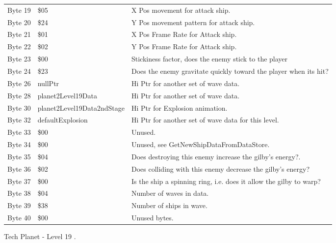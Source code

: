 \begin{figure}[H]
{\begin{adjustbox}{width=12cm}
\begin{tabular}{lll}
 Byte 19 & \$05                        & X Pos movement for attack ship.                                    \\
 Byte 20 & \$24                        & Y Pos movement pattern for attack ship.                            \\
 Byte 21 & \$01                        & X Pos Frame Rate for Attack ship.                                  \\
 Byte 22 & \$02                        & Y Pos Frame Rate for Attack ship.                                  \\
 Byte 23 & \$00                        & Stickiness factor, does the enemy stick to the player              \\
 Byte 24 & \$23                        & Does the enemy gravitate quickly toward the player when its hit?   \\
 Byte 26 & nullPtr                    & Hi Ptr for another set of wave data.                               \\
 Byte 28 & planet2Level19Data         & Hi Ptr for another set of wave data.                               \\
 Byte 30 & planet2Level19Data2ndStage & Hi Ptr for Explosion animation.                                    \\
 Byte 32 & defaultExplosion           & Hi Ptr for another set of wave data for this level.                \\
 Byte 33 & \$00                        & Unused.                                                            \\
 Byte 34 & \$00                        & Unused, see GetNewShipDataFromDataStore.                           \\
 Byte 35 & \$04                        & Does destroying this enemy increase the gilby's energy?.           \\
 Byte 36 & \$02                        & Does colliding with this enemy decrease the gilby's energy?        \\
 Byte 37 & \$00                        & Is the ship a spinning ring, i.e. does it allow the gilby to warp? \\
 Byte 38 & \$04                        & Number of waves in data.                                           \\
 Byte 39 & \$38                        & Number of ships in wave.                                           \\
 Byte 40 & \$00                        & Unused bytes.                                                      \\
\bottomrule
\end{tabular}

  \end{adjustbox}

  }\caption*{Tech Planet - Level 19
.}
\end{figure}

